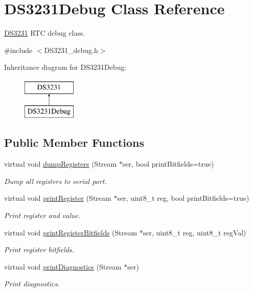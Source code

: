 \hypertarget{class_d_s3231_debug}{}\section{D\+S3231\+Debug Class Reference}
\label{class_d_s3231_debug}


\hyperlink{class_d_s3231}{D\+S3231} R\+TC debug class.  




{\ttfamily \#include $<$D\+S3231\+\_\+debug.\+h$>$}

Inheritance diagram for D\+S3231\+Debug\+:\begin{figure}[H]
\begin{center}
\leavevmode
\includegraphics[height=2.000000cm]{class_d_s3231_debug}
\end{center}
\end{figure}
\subsection*{Public Member Functions}
\begin{DoxyCompactItemize}
\item 
virtual void \hyperlink{class_d_s3231_debug_a26f0361e7f1462b1424bb2bb189af240}{dump\+Registers} (Stream $\ast$ser, bool print\+Bitfields=true)
\begin{DoxyCompactList}\small\item\em Dump all registers to serial port. \end{DoxyCompactList}\item 
virtual void \hyperlink{class_d_s3231_debug_a1e95a14a76374cf459d5e4ccbdb6286e}{print\+Register} (Stream $\ast$ser, uint8\+\_\+t reg, bool print\+Bitfields=true)
\begin{DoxyCompactList}\small\item\em Print register and value. \end{DoxyCompactList}\item 
virtual void \hyperlink{class_d_s3231_debug_ac739b6f1980b8254e57b6966ab1dcc97}{print\+Register\+Bitfields} (Stream $\ast$ser, uint8\+\_\+t reg, uint8\+\_\+t reg\+Val)
\begin{DoxyCompactList}\small\item\em Print register bitfields. \end{DoxyCompactList}\item 
virtual void \hyperlink{class_d_s3231_debug_ae9b7944902fc05ea5dcb608c75564f6a}{print\+Diagnostics} (Stream $\ast$ser)
\begin{DoxyCompactList}\small\item\em Print diagnostics. \end{DoxyCompactList}\end{DoxyCompactItemize}


